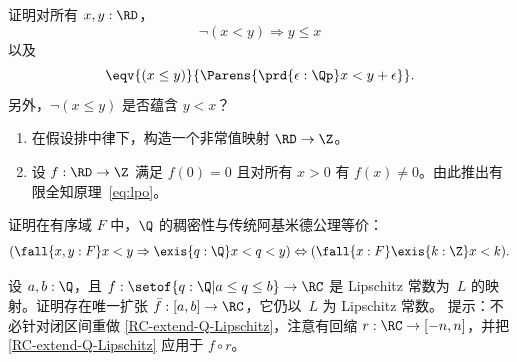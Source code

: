 \begin{ex} \label{ex:RD-lt-vs-le}
  证明对所有 $x, y : \RD$，
  \begin{equation*}
    \lnot (x < y) \Rightarrow y \leq x
  \end{equation*}
  以及
  \begin{equation*}
    \eqv{(x \leq y)}{\Parens{\prd{\epsilon : \Qp} x < y + \epsilon}}.
  \end{equation*}
  另外，$\lnot (x \leq y)$ 是否蕴含 $y < x$？
\end{ex}

\begin{ex} \label{ex:reals-non-constant-into-Z}
  \mbox{}
  \begin{enumerate}
  \item
    在假设排中律下，构造一个非常值映射 $\RD \to \Z$。
  \item
    设 $f : \RD \to \Z$ 满足 $f(0) = 0$ 且对所有 $x >
    0$ 有 $f(x) \neq 0$。由此推出有限全知原理~\eqref{eq:lpo}。
%
  \end{enumerate}
\end{ex}

\begin{ex} \label{ex:traditional-archimedean}
  证明在有序域 $F$ 中，$\Q$ 的稠密性与传统阿基米德公理等价：
  \begin{equation*}
    (\fall{x, y : F} x < y \Rightarrow \exis{q : \Q} x < q < y)
    \Leftrightarrow
    (\fall{x : F} \exis{k : \Z} x < k).
  \end{equation*}
\end{ex}

\begin{ex} \label{RC-Lipschitz-on-interval} 设 $a, b : \Q$，且 $f : \setof{ q : \Q |
    a \leq q \leq b } \to \RC$ 是 Lipschitz 常数为~$L$ 的映射。证明存在唯一扩张
  $\bar{f} : [a,b] \to \RC$，它仍以~$L$ 为 Lipschitz 常数。
  提示：不必针对闭区间重做 \cref{RC-extend-Q-Lipschitz}，注意有回缩 $r : \RC \to [-n,n]$，并把
  \cref{RC-extend-Q-Lipschitz} 应用于 $f \circ r$。
\end{ex}

